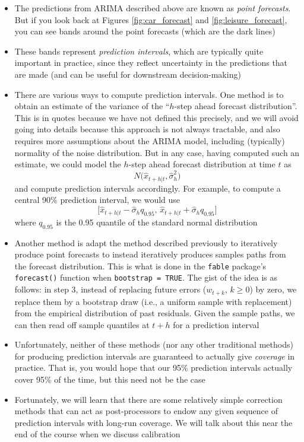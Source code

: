 \documentclass{article}
\begin{document}
\begin{itemize}
\item The predictions  from ARIMA described above are 
    known as \emph{point forecasts}. But if you look back at Figures
    \ref{fig:car_forecast} and \ref{fig:leisure_forecast}, you can see bands
    around the point forecasts (which are the dark lines) 

\item These bands represent \emph{prediction intervals}, which are typically
  quite important in practice, since they reflect uncertainty in the predictions 
  that are made (and can be useful for downstream decision-making)  

\item There are various ways to compute prediction intervals. One method is to
  obtain an estimate  of the variance of the ``$h$-step
  ahead forecast distribution''. This is in quotes because we have not defined
  this precisely, and we will avoid going into details because this approach is
  not always tractable, and also requires more assumptions about the ARIMA
  model, including (typically) normality of the noise distribution. But in any
  case, having computed such an estimate, we could model the $h$-step ahead
  forecast distribution at time $t$ as
  \[
  N\big( \hat{x}_{t+h | t}, \hat\sigma^2_h \big)
  \]
  and compute prediction intervals accordingly. For example, to compute a
  central 90\% prediction interval, we would use 
  \[
  \big[\hat{x}_{t+h | t} - \hat\sigma_h q_{0.95}, \, \hat{x}_{t+h | t} +  
  \hat\sigma_h q_{0.95} \big]
  \]
  where $q_{0.95}$ is the 0.95 quantile of the standard normal distribution

\item Another method is adapt the method described previously to iteratively
  produce point forecasts to instead iteratively produces samples paths from the
  forecast distribution. This is what is done in the \verb|fable| package's
  \verb|forecast()| function when \verb|bootstrap = TRUE|. The gist of the idea
  is as follows: in step 3, instead of replacing future errors ($w_{t+k}$, $k
  \geq 0$) by zero, we replace them by a bootstrap draw (i.e., a uniform sample
  with replacement) from the empirical distribution of past residuals. Given the
  sample paths, we can then read off sample quantiles at $t+h$ for a
  prediction interval   

\item Unfortunately, neither of these methods (nor any other traditional
  methods) for producing prediction intervals are guaranteed to actually give
  \emph{coverage} in practice. That is, you would hope that our 95\% prediction 
  intervals actually cover 95\% of the time, but this need not be the case

\item Fortunately, we will learn that there are some relatively simple
  correction methods that can act as post-processors to endow any given sequence
  of prediction intervals with long-run coverage. We will talk about this near the 
  end of the course when we discuss calibration  
\end{itemize}
\end{document}
